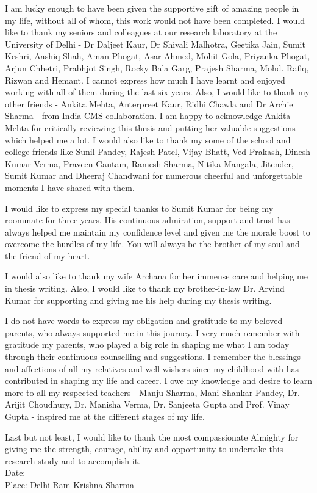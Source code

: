 I am lucky enough to have been given the supportive gift of amazing people in my life, without all of whom, this work would not have been completed. I would like to thank my seniors and colleagues at our research laboratory at the University of Delhi - Dr Daljeet Kaur, Dr Shivali Malhotra, Geetika Jain, Sumit Keshri, Aashiq Shah, Aman Phogat, Asar Ahmed, Mohit Gola, Priyanka Phogat, Arjun Chhetri, Prabhjot Singh, Rocky Bala Garg, Prajesh Sharma, Mohd. Rafiq, Rizwan and Hemant. I cannot express how much I have learnt and enjoyed working with all of them during the last six years. Also, I would like to thank my other friends - Ankita Mehta, Anterpreet Kaur, Ridhi Chawla and Dr Archie Sharma - from India-CMS collaboration.
I am happy to acknowledge Ankita Mehta for critically reviewing this thesis and putting her valuable suggestions which helped me a lot. 
I would also like to thank my some of the school and college friends like Sunil Pandey, Rajesh Patel, Vijay Bhatt, Ved Prakash, Dinesh Kumar Verma, Praveen Gautam, Ramesh Sharma, Nitika Mangala, Jitender, Sumit Kumar and Dheeraj Chandwani for numerous cheerful and unforgettable moments I have shared with them.

I would like to express my special thanks to Sumit Kumar for being my roommate for three years. His continuous admiration, support and trust has always helped me maintain my confidence level and given me the morale boost to overcome the hurdles of my life. You will always be the brother of my soul and the friend of my heart.

I would also like to thank my wife Archana for her immense care and helping me in thesis writing. Also, I would like to thank my brother-in-law Dr. Arvind Kumar for supporting and giving me his help during my thesis writing.

I do not have words to express my obligation and gratitude to my beloved parents, who always supported me in this journey. I very much remember with gratitude my parents, who played a big role in shaping me what I am today through their continuous counselling and suggestions. I remember the blessings and affections of all my relatives and well-wishers since my childhood with has contributed in shaping my life and career. I owe my knowledge and desire to learn more to all my respected teachers - Manju Sharma, Mani Shankar Pandey, Dr. Arijit Choudhury, Dr. Manisha Verma, Dr. Sanjeeta Gupta and Prof. Vinay Gupta - inspired me at the different stages of my life.

Last but not least, I would like to thank the most compassionate Almighty for giving me the strength, courage, ability and opportunity to undertake this research study and to accomplish it.\\[3.0cm]
Date:\\
Place: Delhi \hfill Ram Krishna Sharma
